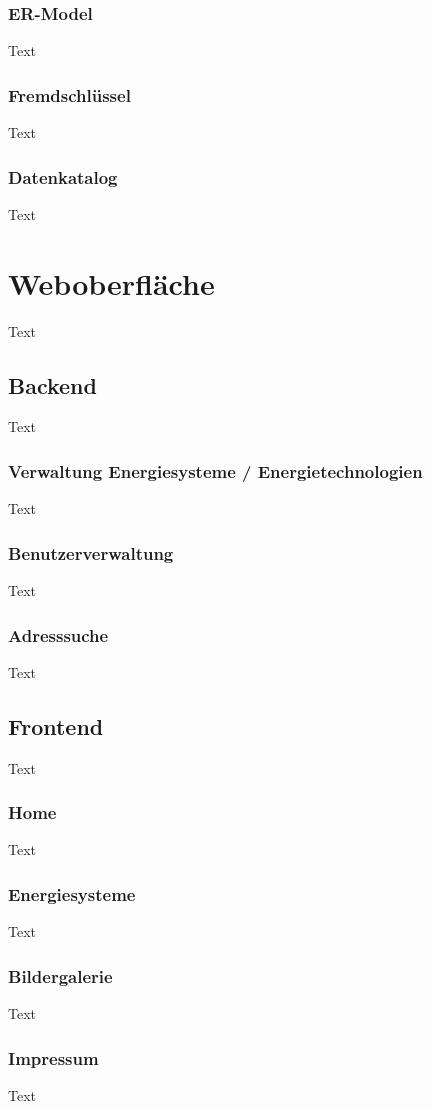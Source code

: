 \subsubsection{ER-Model}
Text
\subsubsection{Fremdschlüssel}
Text
\subsubsection{Datenkatalog}
Text

\section{Weboberfläche}
Text
\subsection{Backend}
Text
\subsubsection{Verwaltung Energiesysteme / Energietechnologien}
Text
\subsubsection{Benutzerverwaltung}
Text
\subsubsection{Adresssuche}
Text

\subsection{Frontend}
Text
\subsubsection{Home}
Text
\subsubsection{Energiesysteme}
Text
\subsubsection{Bildergalerie}
Text
\subsubsection{Impressum}
Text
